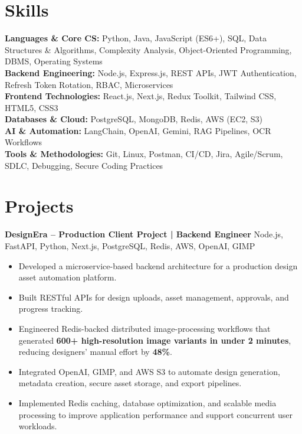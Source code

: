 \documentclass[a4paper,10pt]{article}
\begin{document}
\section*{Skills}

\textbf{Languages \& Core CS:} Python, Java, JavaScript (ES6+), SQL, Data Structures \& Algorithms, Complexity Analysis, Object-Oriented Programming, DBMS, Operating Systems\\[2pt]
\textbf{Backend Engineering:} Node.js, Express.js, REST APIs, JWT Authentication, Refresh Token Rotation, RBAC, Microservices\\[2pt]
\textbf{Frontend Technologies:} React.js, Next.js, Redux Toolkit, Tailwind CSS, HTML5, CSS3\\[2pt]
\textbf{Databases \& Cloud:} PostgreSQL, MongoDB, Redis, AWS (EC2, S3)\\[2pt]
\textbf{AI \& Automation:} LangChain, OpenAI, Gemini, RAG Pipelines, OCR Workflows\\[2pt]
\textbf{Tools \& Methodologies:} Git, Linux, Postman, CI/CD, Jira, Agile/Scrum, SDLC, Debugging, Secure Coding Practices

\section*{Projects}

\textbf{DesignEra -- Production Client Project | Backend Engineer} \hfill Node.js, FastAPI, Python, Next.js, PostgreSQL, Redis, AWS, OpenAI, GIMP

\begin{itemize}[leftmargin=*]
    \item Developed a microservice-based backend architecture for a production design asset automation platform.
    \item Built RESTful APIs for design uploads, asset management, approvals, and progress tracking.
   \item Engineered Redis-backed distributed image-processing workflows that generated \textbf{600+ high-resolution image variants in under 2 minutes}, reducing designers' manual effort by \textbf{48\%}.
    \item Integrated OpenAI, GIMP, and AWS S3 to automate design generation, metadata creation, secure asset storage, and export pipelines.
    \item Implemented Redis caching, database optimization, and scalable media processing to improve application performance and support concurrent user workloads.
\end{itemize}
\end{document}
